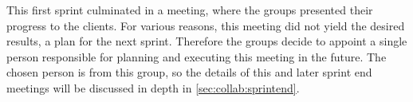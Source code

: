 This first sprint culminated in a meeting, where the groups presented their progress to the clients.
For various reasons, this meeting did not yield the desired results, a plan for the next sprint.
Therefore the groups decide to appoint a single person responsible for planning and executing this meeting in the future.
The chosen person is from this group, so the details of this and later sprint end meetings will be discussed in depth in \cref{sec:collab:sprintend}.
